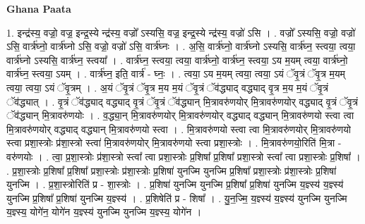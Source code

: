 \documentclass[17pt]{extarticle}
\begin{document}
\textbf{Ghana Paata } \newline

1. इन्द्र॑स्य॒ वज्रो॒ वज्र॒ इन्द्र॒स्ये न्द्र॑स्य॒ वज्रो᳚ ऽस्यसि॒ वज्र॒ इन्द्र॒स्ये न्द्र॑स्य॒ वज्रो॑ ऽसि । . वज्रो᳚ ऽस्यसि॒ वज्रो॒ वज्रो॑ ऽसि॒ वार्त्र॑घ्नो॒ वार्त्र॑घ्नो ऽसि॒ वज्रो॒ वज्रो॑ ऽसि॒ वार्त्र॑घ्नः । . अ॒सि॒ वार्त्र॑घ्नो॒ वार्त्र॑घ्नो ऽस्यसि॒ वार्त्र॑घ्न॒ स्त्वया॒ त्वया॒ वार्त्र॑घ्नो ऽस्यसि॒ वार्त्र॑घ्न॒ स्त्वया᳚ । . वार्त्र॑घ्न॒ स्त्वया॒ त्वया॒ वार्त्र॑घ्नो॒ वार्त्र॑घ्न॒ स्त्वया॒ ऽय म॒यम् त्वया॒ वार्त्र॑घ्नो॒ वार्त्र॑घ्न॒ स्त्वया॒ ऽयम् । . वार्त्र॑घ्न॒ इति॒ वार्त्र॑ - घ्नः॒ । . त्वया॒ ऽय म॒यम् त्वया॒ त्वया॒ ऽयं ॅवृ॒त्रं ॅवृ॒त्र म॒यम् त्वया॒ त्वया॒ ऽयं ॅवृ॒त्रम् । . अ॒यं ॅवृ॒त्रं ॅवृ॒त्र म॒य म॒यं ॅवृ॒त्रं ॅव॑द्ध्याद् वद्ध्याद् वृ॒त्र म॒य म॒यं ॅवृ॒त्रं ॅव॑द्ध्यात् । . वृ॒त्रं ॅव॑द्ध्याद् वद्ध्याद् वृ॒त्रं ॅवृ॒त्रं ॅव॑द्ध्यान् मि॒त्रावरु॑णयोर् मि॒त्रावरु॑णयोर् वद्ध्याद् वृ॒त्रं ॅवृ॒त्रं ॅव॑द्ध्यान् मि॒त्रावरु॑णयोः । . व॒द्ध्या॒न् मि॒त्रावरु॑णयोर् मि॒त्रावरु॑णयोर् वद्ध्याद् वद्ध्यान् मि॒त्रावरु॑णयो स्त्वा त्वा मि॒त्रावरु॑णयोर् वद्ध्याद् वद्ध्यान् मि॒त्रावरु॑णयो स्त्वा । . मि॒त्रावरु॑णयो स्त्वा त्वा मि॒त्रावरु॑णयोर् मि॒त्रावरु॑णयो स्त्वा प्रशा॒स्त्रोः प्र॑शा॒स्त्रो स्त्वा॑ मि॒त्रावरु॑णयोर् मि॒त्रावरु॑णयो स्त्वा प्रशा॒स्त्रोः । . मि॒त्रावरु॑णयो॒रिति॑ मि॒त्रा - वरु॑णयोः । . त्वा॒ प्र॒शा॒स्त्रोः प्र॑शा॒स्त्रो स्त्वा᳚ त्वा प्रशा॒स्त्रोः प्र॒शिषा᳚ प्र॒शिषा᳚ प्रशा॒स्त्रो स्त्वा᳚ त्वा प्रशा॒स्त्रोः प्र॒शिषा᳚ । . प्र॒शा॒स्त्रोः प्र॒शिषा᳚ प्र॒शिषा᳚ प्रशा॒स्त्रोः प्र॑शा॒स्त्रोः प्र॒शिषा॑ युनज्मि युनज्मि प्र॒शिषा᳚ प्रशा॒स्त्रोः प्र॑शा॒स्त्रोः प्र॒शिषा॑ युनज्मि । . प्र॒शा॒स्त्रोरिति॑ प्र - शा॒स्त्रोः । . प्र॒शिषा॑ युनज्मि युनज्मि प्र॒शिषा᳚ प्र॒शिषा॑ युनज्मि य॒ज्ञ्स्य॑ य॒ज्ञ्स्य॑ युनज्मि प्र॒शिषा᳚ प्र॒शिषा॑ युनज्मि य॒ज्ञ्स्य॑ । . प्र॒शिषेति॑ प्र - शिषा᳚ । . यु॒न॒ज्मि॒ य॒ज्ञ्स्य॑ य॒ज्ञ्स्य॑ युनज्मि युनज्मि य॒ज्ञ्स्य॒ योगे॑न॒ योगे॑न य॒ज्ञ्स्य॑ युनज्मि युनज्मि य॒ज्ञ्स्य॒ योगे॑न । \newline
\end{document}
